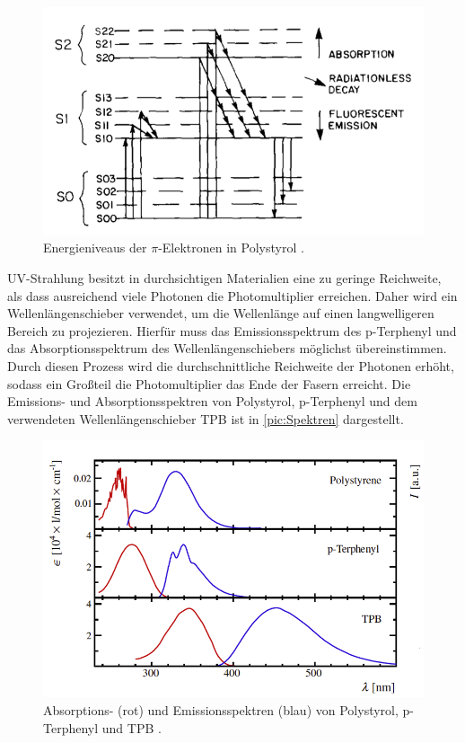 \begin{figure}
    \centering
    \includegraphics[width = .8\textwidth]{content/pics/Energieniveaus.png}
    \caption{Energieniveaus der $\pi$-Elektronen in Polystyrol \cite{SciFi_Versuch}.}
    \label{pic:Energieniveaus}
\end{figure}
UV-Strahlung besitzt in durchsichtigen Materialien eine zu geringe Reichweite, als dass ausreichend viele Photonen die Photomultiplier
erreichen. Daher wird ein Wellenlängenschieber verwendet, um die Wellenlänge auf einen langwelligeren Bereich
zu projezieren. Hierfür muss das Emissionsspektrum des p-Terphenyl und das Absorptionsspektrum des Wellenlängenschiebers
möglichst übereinstimmen. Durch diesen Prozess wird die durchschnittliche Reichweite der Photonen erhöht, sodass
ein Großteil die Photomultiplier das Ende der Fasern erreicht. Die Emissions- und Absorptionsspektren von Polystyrol,
p-Terphenyl und dem verwendeten Wellenlängenschieber TPB ist in \autoref{pic:Spektren} dargestellt.
\begin{figure}
    \centering
    \includegraphics[width = .8\textwidth]{content/pics/Spektren.png}
    \caption{Absorptions- (rot) und Emissionsspektren (blau) von Polystyrol, p-Terphenyl und TPB \cite{SciFi_Versuch}.}
    \label{pic:Spektren}
\end{figure}

